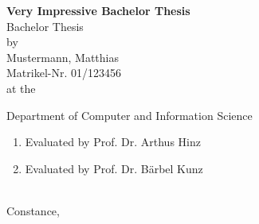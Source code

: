 
\newcommand{\MyTitle}{Very Impressive Bachelor Thesis}
\newcommand{\MyThesisType}{Bachelor Thesis}
\newcommand{\MyAuthor}{Mustermann, Matthias}
\newcommand{\MyStudentID}{01/123456}

\newcommand{\MyDepartement}{Department of Computer and Information Science}

\newcommand{\MyCorrectorA}{Prof. Dr. Arthus Hinz}
\newcommand{\MyCorrectorB}{Prof. Dr. B\"arbel Kunz}

\begin{titlepage}
\pagestyle{empty}
\begin{center}

{\Huge \textbf{\MyTitle}} \\[2cm]

{\Large \MyThesisType} \\[1cm]

{\Large by \\[.3cm]
\MyAuthor \\
Matrikel-Nr. \MyStudentID} \\[1cm]

{\Large at the}


{\Large \MyDepartement}\\[1cm]

{\Large
\begin{enumerate}
    \item Evaluated by \MyCorrectorA
    \item Evaluated by \MyCorrectorB
\end{enumerate}
} \ \\[1cm]

{\Large Constance, \the\year}

\end{center}

\cleardoublepage

\pagestyle{plain}
\setcounter{page}{1}
\end{titlepage}
